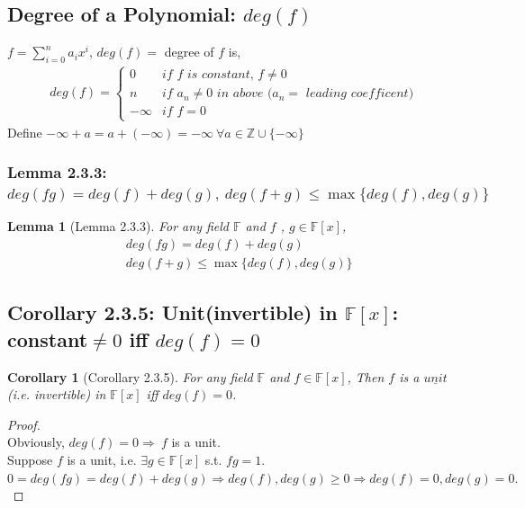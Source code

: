 \documentclass[11pt,a4paper]{article}
\newtheorem{lemma}{Lemma}
\newtheorem{corollary}{Corollary}
\begin{document}
\subsection{Degree of a Polynomial: $deg(f)$}
$f=\sum_{i=0}^na_ix^i$, $deg(f)=$ degree of $f$ is,
\begin{equation}
    \begin{aligned}
        deg(f)=\left\{\begin{matrix}
            0& \textit{if $f$ is constant, $f\neq0$}\\
            n& \textit{if $a_n\neq0$ in above ($a_n=$ leading coefficent)}\\
            -\infty& \textit{if } f=0
        \end{matrix}\right.
    \end{aligned}
    \nonumber
\end{equation}
Define $-\infty+ a = a + (-\infty) = -\infty\ \forall a \in \mathbb{Z} \cup \{-\infty\}$
\subsubsection{Lemma 2.3.3: $deg(fg)=deg(f)+deg(g)
,\ deg(f+g)\leq\max\{deg(f),deg(g)\}$}
\begin{lemma}[Lemma 2.3.3]
    For any field $\mathbb{F}$ and $f$ , $g \in \mathbb{F}[x]$,
    \begin{equation}
        \begin{aligned}
            &deg(fg)=deg(f)+deg(g)\\
            &deg(f+g)\leq\max\{deg(f),deg(g)\}
        \end{aligned}
        \nonumber
    \end{equation}
\end{lemma}


\subsection{Corollary 2.3.5: Unit(invertible) in $\mathbb{F}[x]$: constant$\neq 0$ iff $deg(f)=0$}
\begin{corollary}[Corollary 2.3.5]
    For any field $\mathbb{F}$ and $f \in \mathbb{F}[x]$, Then $f$ is a $\underline{unit}$(i.e. invertible) in $\mathbb{F}[x]$ iff $deg(f)=0$.
\end{corollary}
\begin{proof}
\quad\\
Obviously, $deg(f)=0\Rightarrow\ f$ is a unit.\\
Suppose $f$ is a unit, i.e. $\exists g\in\mathbb{F}[x]$ s.t. $fg=1$.\\
$0=deg(fg)=deg(f)+deg(g)\Rightarrow deg(f),deg(g)\geq0\Rightarrow deg(f)=0,deg(g)=0.$
\end{proof}
\end{document}

